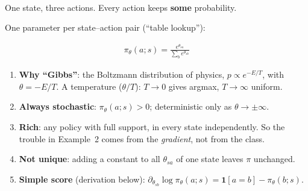\begin{minipage}[c]{0.44\linewidth}
\centering
{}\\
{\scriptsize One state, three actions. Every action keeps \textbf{some} probability.}
\end{minipage}\hfill
\begin{minipage}[c]{0.53\linewidth}
One parameter per state--action pair (``table lookup''):
\begin{eqbox}
\begin{gather*}
  \pi_\theta(a;s) = \frac{e^{\theta_{sa}}}{\sum_b e^{\theta_{sb}}}
\end{gather*}
\end{eqbox}
\end{minipage}

\begin{enumerate}
  \item \textbf{Why ``Gibbs''}: the Boltzmann distribution of physics, $p\propto e^{-E/T}$, with $\theta=-E/T$. A temperature ($\theta/T$): $T\to0$ gives argmax, $T\to\infty$ uniform.
  \item \textbf{Always stochastic}: $\pi_\theta(a;s)>0$; deterministic only as $\theta\to\pm\infty$.
  \item \textbf{Rich}: any policy with full support, in every state independently. So the trouble in Example~2 comes from the \emph{gradient}, not from the class.
  \item \textbf{Not unique}: adding a constant to all $\theta_{sa}$ of one state leaves $\pi$ unchanged.
  \item \textbf{Simple score} (derivation below): $\partial_{\theta_{sb}}\log\pi_\theta(a;s)=\mathbf 1[a=b]-\pi_\theta(b;s)$.
\end{enumerate}

